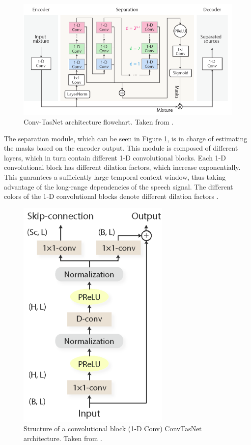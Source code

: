 \documentclass{article}
\begin{document}
\begin{figure}[!h]
    \centering
    \includegraphics[scale=0.5]{Figures/arquitecturas/B.System_flowchart.png}
    \caption{Conv-TasNet architecture flowchart. Taken from \cite{luo2019conv}.}
    \label{fig:system_flowchart}
\end{figure}

The separation module, which can be seen in Figure \ref{fig:system_flowchart}, is in charge of estimating the masks based on the encoder output. This module is composed of different layers, which in turn contain different 1-D convolutional blocks. Each 1-D convolutional block has different dilation factors, which increase exponentially. This guarantees a sufficiently large temporal context window, thus taking advantage of the long-range dependencies of the speech signal. The different colors of the 1-D convolutional blocks denote different dilation factors \cite{luo2019conv}.


\begin{figure}[!h]
    \centering
    \includegraphics[scale=0.6]{Figures/arquitecturas/C.1-D_Conv_block_design.png}
    \caption{Structure of a convolutional block (1-D Conv) ConvTasNet architecture. Taken from \cite{luo2019conv}.}
    \label{fig:block_conv}
\end{figure}
\end{document}
